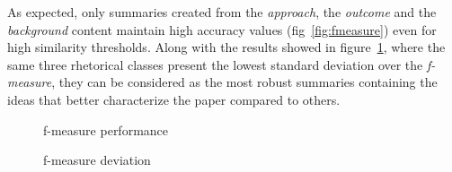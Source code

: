 As expected, only summaries created from the \textit{approach}, the \textit{outcome} and the \textit{background} content maintain high accuracy values (fig~\ref{fig:fmeasure}) even for high similarity thresholds. Along with the results showed in figure~\ref{fig:stdeviation}, where the same three rhetorical classes present the lowest standard deviation over the \textit{f-measure}, they can be considered as the most robust summaries containing the ideas that better characterize the paper compared to others.

\begin{figure}[!htb]\centering
   \begin{minipage}{0.49\textwidth}
     \caption{f-measure performance}\label{fig:fmeasure}
   \end{minipage}
   \begin {minipage}[c]{0.49\textwidth}
     \caption{f-measure deviation}\label{fig:stdeviation}
   \end{minipage}
\end{figure}


